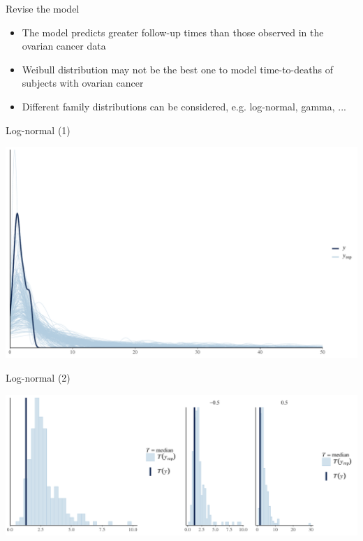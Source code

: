 \documentclass[ignorenonframetext,a4paper]{beamer}
\begin{document}
\begin{frame}{Revise the model}

\begin{itemize}
  \item{The model predicts greater follow-up times than those observed
        in the ovarian cancer data}
  \item{Weibull distribution may not be the best one to model 
        time-to-deaths of subjects with ovarian cancer}
  \item{Different family distributions can be considered, e.g.
        log-normal, gamma, ...}
\end{itemize}

\end{frame}

\begin{frame}{Log-normal (1)}

\includegraphics{DB_presentation_case_study_files/figure-beamer/unnamed-chunk-17-1.pdf}

\end{frame}

\begin{frame}{Log-normal (2)}

\includegraphics{DB_presentation_case_study_files/figure-beamer/unnamed-chunk-18-1.pdf}

\end{frame}
\end{document}
